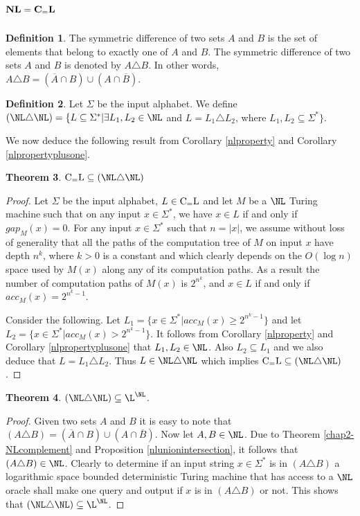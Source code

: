\documentclass{amsbook}
\newtheorem{theorem}{Theorem}[chapter]
\theoremstyle{definition}
\newtheorem{definition}[theorem]{Definition}
\theoremstyle{remark}
\numberwithin{section}{chapter}
\numberwithin{equation}{chapter}
\newcommand{\boldNL}{\mbox{\rm \bf NL}}
\newcommand{\CeqL}{\mbox{\rm C$_=$L}}
\newcommand{\boldCeqL}{\mbox{\rm \bf C{\bf $_\mathbf{=}$}L}}
\begin{document}
\section{$\boldNL=\boldCeqL$}
\begin{definition}
The symmetric difference of two sets $A$ and $B$ is the set of elements that belong to exactly one of $A$ and $B$. The symmetric difference of two sets $A$ and $B$ is denoted by $A\triangle B$. In other words, $A\triangle B=(\overline{A}\cap B)\cup (A\cap\overline{B})$.
\end{definition}
\begin{definition}
Let $\Sigma$ be the input alphabet. We define $(\NL\triangle\NL)=\{ L\subseteq\Sigma^*|\exists L_1,L_2\in\NL$ and $L=L_1\triangle L_2$, where $L_1,L_2\subseteq\Sigma^*\}$.
\end{definition}
We now deduce the following result from Corollary \ref{nlproperty} and Corollary \ref{nlpropertyplusone}.
\begin{theorem}\label{ceqlnldeltanl}
$\CeqL\subseteq(\NL\triangle\NL)$
\end{theorem}
\begin{proof}
Let $\Sigma$ be the input alphabet, $L\in\CeqL$ and let $M$ be a $\NL$ Turing machine such that on any input $x\in\Sigma^*$, we have $x\in L$ if and only if $gap_M(x)=0$. For any input $x\in\Sigma^*$ such that $n=|x|$, we assume without loss of generality that all the paths of the computation tree of $M$ on input $x$ have depth $n^k$, where $k>0$ is a constant and which clearly depends on the $O(\log n)$ space used by $M(x)$ along any of its computation paths. As a result the number of computation paths of $M(x)$ is $2^{n^k}$, and $x\in L$ if and only if $acc_M(x)=2^{n^k-1}$.

Consider the following. Let $L_1=\{x\in\Sigma^*|acc_M(x)\geq 2^{n^k-1}\}$ and let $L_2=\{x\in\Sigma^*|acc_M(x)>2^{n^k-1}\}$. It follows from Corollary \ref{nlproperty} and Corollary \ref{nlpropertyplusone} that $L_1,L_2\in\NL$. Also $L_2\subseteq L_1$ and we also deduce that $L=L_1\triangle L_2$. Thus $L\in\NL\triangle\NL$ which implies $\CeqL\subseteq(\NL\triangle\NL)$.
\end{proof}

\begin{theorem}\label{nldeltanllnl}
$(\NL\triangle\NL)\subseteq\L^{\NL}$.
\end{theorem}
\begin{proof}
Given two sets $A$ and $B$ it is easy to note that $(A\triangle B)=(\overline {A}\cap B)\cup (A\cap \overline{B})$. Now let $A,B\in\NL$. Due to Theorem \ref{chap2-NLcomplement} and Proposition \ref{nlunionintersection}, it follows that $(A\triangle B)\in\NL$. Clearly to determine if an input string $x\in\Sigma^*$ is in $(A\triangle B)$ a logarithmic space bounded deterministic Turing machine that has access to a $\NL$ oracle shall make one query and output if $x$ is in $(A\triangle B)$ or not. This shows that $(\NL\triangle\NL)\subseteq\L^{\NL}$.
\end{proof}
\end{document}
